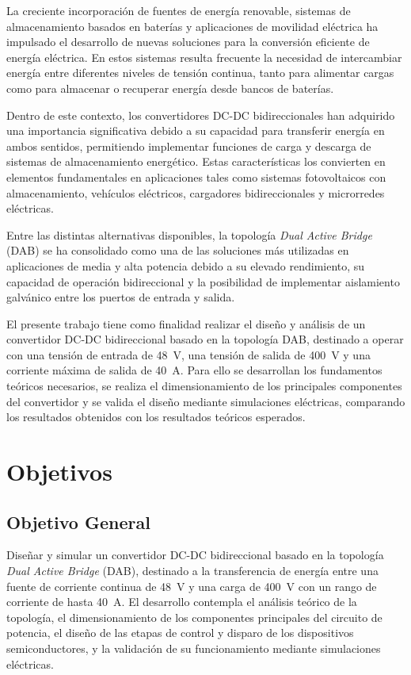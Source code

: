 \documentclass[11pt, a4paper]{article}
\begin{document}
La creciente incorporación de fuentes de energía renovable, sistemas de almacenamiento basados en baterías y aplicaciones de movilidad eléctrica ha impulsado el desarrollo de nuevas soluciones para la conversión eficiente de energía eléctrica. En estos sistemas resulta frecuente la necesidad de intercambiar energía entre diferentes niveles de tensión continua, tanto para alimentar cargas como para almacenar o recuperar energía desde bancos de baterías.

Dentro de este contexto, los convertidores DC-DC bidireccionales han adquirido una importancia significativa debido a su capacidad para transferir energía en ambos sentidos, permitiendo implementar funciones de carga y descarga de sistemas de almacenamiento energético. Estas características los convierten en elementos fundamentales en aplicaciones tales como sistemas fotovoltaicos con almacenamiento, vehículos eléctricos, cargadores bidireccionales y microrredes eléctricas.

Entre las distintas alternativas disponibles, la topología \textit{Dual Active Bridge} (DAB) se ha consolidado como una de las soluciones más utilizadas en aplicaciones de media y alta potencia debido a su elevado rendimiento, su capacidad de operación bidireccional y la posibilidad de implementar aislamiento galvánico entre los puertos de entrada y salida.

El presente trabajo tiene como finalidad realizar el diseño y análisis de un convertidor DC-DC bidireccional basado en la topología DAB, destinado a operar con una tensión de entrada de \SI{48}{V}, una tensión de salida de \SI{400}{V} y una corriente máxima de salida de \SI{40}{A}. Para ello se desarrollan los fundamentos teóricos necesarios, se realiza el dimensionamiento de los principales componentes del convertidor y se valida el diseño mediante simulaciones eléctricas, comparando los resultados obtenidos con los resultados teóricos esperados.

\section{Objetivos}

\subsection{Objetivo General}

Diseñar y simular un convertidor DC-DC bidireccional basado en la topología \textit{Dual Active Bridge} (DAB), destinado a la transferencia de energía entre una fuente de corriente continua de \SI{48}{V} y una carga de \SI{400}{V} con un rango de corriente de hasta \SI{40}{A}. El desarrollo contempla el análisis teórico de la topología, el dimensionamiento de los componentes principales del circuito de potencia, el diseño de las etapas de control y disparo de los dispositivos semiconductores, y la validación de su funcionamiento mediante simulaciones eléctricas.
\end{document}
